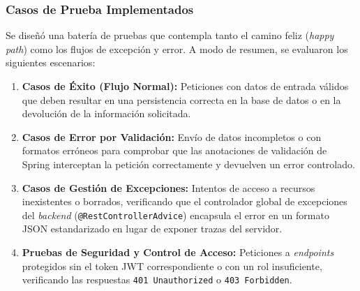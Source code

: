 \subsubsection{Casos de Prueba Implementados}
Se diseñó una batería de pruebas que contempla tanto el camino feliz (\textit{happy path}) como los flujos de excepción y error. A modo de resumen, se evaluaron los siguientes escenarios:

\begin{enumerate}
    \item \textbf{Casos de Éxito (Flujo Normal):} Peticiones con datos de entrada válidos que deben resultar en una persistencia correcta en la base de datos o en la devolución de la información solicitada.
    \item \textbf{Casos de Error por Validación:} Envío de datos incompletos o con formatos erróneos para comprobar que las anotaciones de validación de Spring interceptan la petición correctamente y devuelven un error controlado.
    \item \textbf{Casos de Gestión de Excepciones:} Intentos de acceso a recursos inexistentes o borrados, verificando que el controlador global de excepciones del \textit{backend} (\texttt{@RestControllerAdvice}) encapsula el error en un formato JSON estandarizado en lugar de exponer trazas del servidor.
    \item \textbf{Pruebas de Seguridad y Control de Acceso:} Peticiones a \textit{endpoints} protegidos sin el token JWT correspondiente o con un rol insuficiente, verificando las respuestas \texttt{401 Unauthorized} o \texttt{403 Forbidden}.
\end{enumerate}


